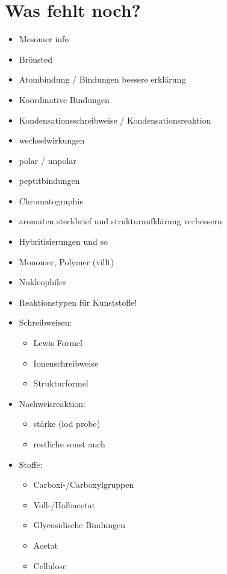 
\chapter{Was fehlt noch?}
\begin{itemize}
    \item Mesomer info
    \item Brönsted
    \item Atombindung / Bindungen bessere erklärung
    \item Koordinative Bindungen
    \item Kondensationsschreibweise / Kondensationsreaktion
    \item wechselwirkungen
    \item polar / unpolar
    \item peptitbindungen
    \item Chromatographie
    \item aromaten steckbrief und strukturaufklärung verbessern
    \item Hybritisierungen und so
    \item Monomer, Polymer (villt)
    \item Nukleophiler
    \item Reaktionstypen für Kunststoffe!
    
    \item Schreibweisen:
    \begin{itemize}
        \item Lewis Formel
        \item Ionenschreibweise
        \item Strukturformel
    \end{itemize}

    \item Nachweisreaktion:
    \begin{itemize}
        \item stärke (iod probe)
        \item restliche sonst auch
    \end{itemize}

    \item Stoffe:
    \begin{itemize}
        \item Carboxi-/Carboxylgruppen
        \item Voll-/Halbacetat
        \item Glycosidische Bindungen
        \item Acetat
        \item Cellulose
    \end{itemize}
\end{itemize}

